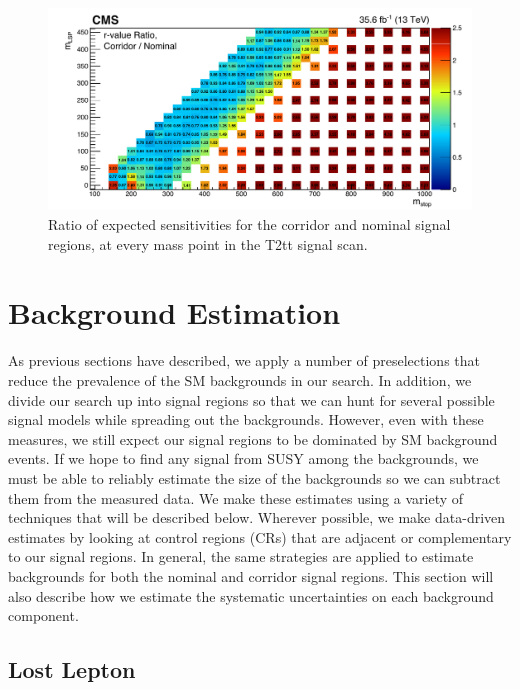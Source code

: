 \begin{figure}
\centering
\includegraphics{figures/rratioplot.pdf}
\caption{Ratio of expected sensitivities for the corridor and nominal
  signal regions, at every mass point in the T2tt signal scan.}
\label{fig:stop:rratio}
\end{figure}


\section{Background Estimation}
\label{sec:stop:bkgest}

As previous sections have described, we apply a number of
preselections that reduce the prevalence of the SM backgrounds in our
search. In addition, we divide our search up into signal
regions so that we can hunt for several possible signal models while
spreading out the backgrounds. However, even with these measures,
we still expect our signal regions to be dominated by SM background
events. If we hope to find any signal from SUSY among the backgrounds,
we must be able to reliably estimate the size of the backgrounds so we
can subtract them from the measured data. We make these estimates
using a variety of techniques that will be described below. Wherever
possible, we make data-driven estimates by looking at control regions
(CRs) that are adjacent or complementary to our signal regions. In
general, the same strategies are applied to estimate backgrounds for
both the nominal and corridor signal regions. This section will also
describe how we estimate the systematic uncertainties on each
background component.

\subsection{Lost Lepton}
\label{ssec:stop:lostlep}

